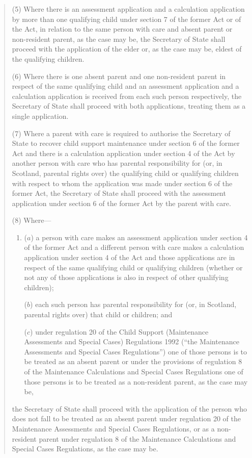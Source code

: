 \documentclass[12pt,a4paper]{article}
\begin{document}
\begin{quotation}
(5) Where there is an assessment application and a calculation application by more than one qualifying child under section 7 of the former Act or of the Act, in relation to the same person with care and absent parent or non-resident parent, as the case may be, the Secretary of State shall proceed with the application of the elder or, as the case may be, eldest of the qualifying children.

(6) Where there is one absent parent and one non-resident parent in respect of the same qualifying child and an assessment application and a calculation application is received from each such person respectively, the Secretary of State shall proceed with both applications, treating them as a single application.

(7) Where a parent with care is required to authorise the Secretary of State to recover child support maintenance under section 6 of the former Act and there is a calculation application under section 4 of the Act by another person with care who has parental responsibility for (or, in Scotland, parental rights over) the qualifying child or qualifying children with respect to whom the application was made under section 6 of the former Act, the Secretary of State shall proceed with the assessment application under section 6 of the former Act by the parent with care.

(8) Where—
\begin{enumerate}\item[]
($a$) a person with care makes an assessment application under section 4 of the former Act and a different person with care makes a calculation application under section 4 of the Act and those applications are in respect of the same qualifying child or qualifying children (whether or not any of those applications is also in respect of other qualifying children);

($b$) each such person has parental responsibility for (or, in Scotland, parental rights over) that child or children; and

($c$) under regulation 20 of the Child Support (Maintenance Assessments and Special Cases) Regulations 1992 (“the Maintenance Assessments and Special Cases Regulations”) one of those persons is to be treated as an absent parent or under the provisions of regulation 8 of the Maintenance Calculations and Special Cases Regulations one of those persons is to be treated as a non-resident parent, as the case may be,
\end{enumerate}
the Secretary of State shall proceed with the application of the person who does not fall to be treated as an absent parent under regulation 20 of the Maintenance Assessments and Special Cases Regulations, or as a non-resident parent under regulation 8 of the Maintenance Calculations and Special Cases Regulations, as the case may be.


\end{quotation}
\end{document}

